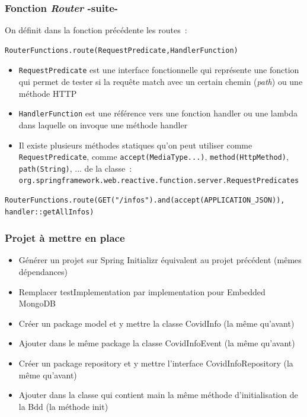 \documentclass{beamer}
\begin{document}
\begin{frame}[fragile]
	\frametitle{Fonction \textit{Router} -suite-}
	On définit dans la fonction précédente les routes~:	
\begin{lstlisting}
RouterFunctions.route(RequestPredicate,HandlerFunction)
\end{lstlisting}
	\begin{itemize}
	\item \texttt{RequestPredicate} est une interface fonctionnelle qui représente une fonction qui permet de tester si la requête match avec un certain chemin (\textit{path}) ou une méthode HTTP
	\item \texttt{HandlerFunction} est une référence vers une fonction handler ou une lambda dans laquelle on invoque une méthode handler
	\item Il existe plusieurs méthodes statiques qu'on peut utiliser comme \texttt{RequestPredicate}, comme \texttt{accept(MediaType...)}, \texttt{method(HttpMethod)}, \texttt{path(String)}, ... de la classe~:
	{\scriptsize \texttt{org.springframework.web.reactive.function.server.RequestPredicates} }
	\end{itemize}
\begin{lstlisting}
RouterFunctions.route(GET("/infos").and(accept(APPLICATION_JSON)), handler::getAllInfos)
\end{lstlisting}
\end{frame}

\begin{frame}[fragile]
	\frametitle{Projet à mettre en place}
	\begin{itemize}
		\item Générer un projet sur Spring Initializr équivalent au projet précédent (mêmes dépendances)
		\item Remplacer testImplementation par implementation pour Embedded MongoDB
		\item Créer un package model et y mettre la classe CovidInfo (la même qu'avant)
		\item Ajouter dans le même package la classe CovidInfoEvent (la même qu'avant)
		\item Créer un package repository et y mettre l'interface CovidInfoRepository (la même qu'avant)
		\item Ajouter dans la classe qui contient main la même méthode d'initialisation de la Bdd (la méthode init)
	\end{itemize}
\end{frame}
\end{document}
